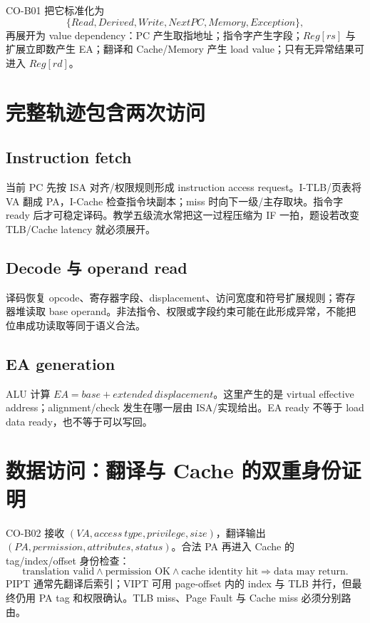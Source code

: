 \documentclass[UTF8,fontset=fandol,11pt,a4paper]{ctexart}
\begin{document}
CO-B01 把它标准化为
\[
\{Read,Derived,Write,NextPC,Memory,Exception\},
\]
再展开为 value dependency：PC 产生取指地址；指令字产生字段；$Reg[rs]$ 与扩展立即数产生 EA；翻译和 Cache/Memory 产生 load value；只有无异常结果可进入 $Reg[rd]$。

\section{完整轨迹包含两次访问}
\subsection{Instruction fetch}
当前 PC 先按 ISA 对齐/权限规则形成 instruction access request。I-TLB/页表将 VA 翻成 PA，I-Cache 检查指令块副本；miss 时向下一级/主存取块。指令字 ready 后才可稳定译码。教学五级流水常把这一过程压缩为 IF 一拍，题设若改变 TLB/Cache latency 就必须展开。

\subsection{Decode 与 operand read}
译码恢复 opcode、寄存器字段、displacement、访问宽度和符号扩展规则；寄存器堆读取 base operand。非法指令、权限或字段约束可能在此形成异常，不能把位串成功读取等同于语义合法。

\subsection{EA generation}
ALU 计算 $EA=base+extended\ displacement$。这里产生的是 virtual effective address；alignment/check 发生在哪一层由 ISA/实现给出。EA ready 不等于 load data ready，也不等于可以写回。

\section{数据访问：翻译与 Cache 的双重身份证明}
CO-B02 接收 $(VA,access\ type,privilege,size)$，翻译输出 $(PA,permission,attributes,status)$。合法 PA 再进入 Cache 的 tag/index/offset 身份检查：
\[
\text{translation valid}\land\text{permission OK}\land\text{cache identity hit}
\Rightarrow\text{data may return}.
\]
PIPT 通常先翻译后索引；VIPT 可用 page-offset 内的 index 与 TLB 并行，但最终仍用 PA tag 和权限确认。TLB miss、Page Fault 与 Cache miss 必须分别路由。
\end{document}
